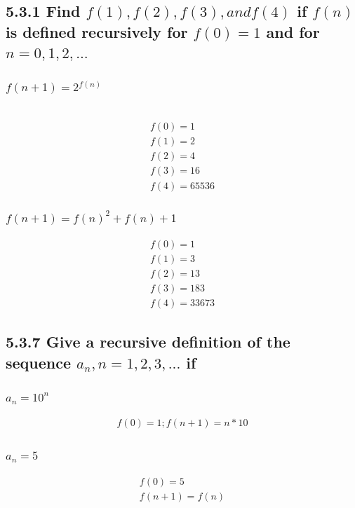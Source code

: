 \documentclass[12pt, a4paper]{report}
\begin{document}
				\subsection{5.3.1 Find $f(1),f(2),f(3), and f(4)$ if $f(n)$ is defined recursively for $f(0)=1$ and for $n=0,1,2,...$}
					\setcounter{subsubsection}{2}
					\subsubsection{$f(n+1)=2^{f(n)}$}\
						\begin{align*}
							f(0)=1\\
							f(1)=2\\
							f(2)=4\\
							f(3)=16\\
							f(4)=65536
						\end{align*}
					\subsubsection{$f(n+1)=f(n)^2+f(n)+1$}
						\begin{align*}
							f(0)=1\\
							f(1)=3\\
							f(2)=13\\
							f(3)=183\\
							f(4)=33673
						\end{align*}
				\setcounter{subsection}{6}
				\subsection{5.3.7 Give a recursive definition of the sequence ${a_n},n=1,2,3,...$ if }
					\setcounter{subsubsection}{2}
					\subsubsection{$a_n=10^n$}
						\begin{align*}
							f(0)=1;
							f(n+1)=n*10
						\end{align*}
					\subsubsection{$a_n=5$}
						\begin{align*}
							f(0)=5\\
							f(n+1)=f(n)
						\end{align*}
\end{document}
